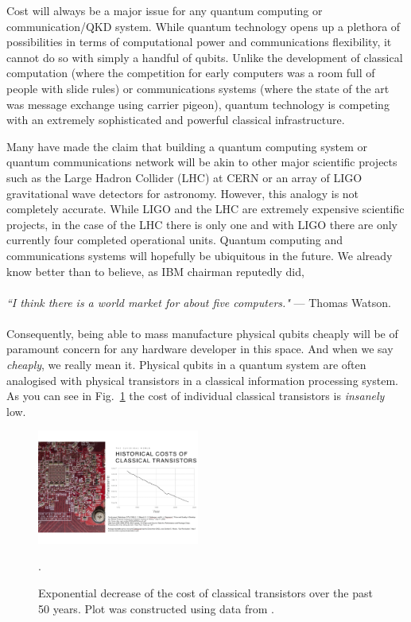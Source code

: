 \documentclass[twocolumn, aps, rmp, amsmath, amssymb, nofootinbib, superscriptaddress, longbibliography, floatfix, table-of-contents, eqsecnum]{revtex4-2}
\newcommand{\famousquote}[2]{\noindent\textit{``#1"} --- #2.\index{Quotes}\index{#2}}
\begin{document}
Cost will always be a major issue for any quantum computing or communication/QKD system. While quantum technology opens up a plethora of possibilities in terms of computational power and communications flexibility, it cannot do so with simply a handful of qubits. Unlike the development of classical computation (where the competition for early computers was a room full of people with slide rules) or communications systems (where the state of the art was message exchange using carrier pigeon), quantum technology is competing with an extremely sophisticated and powerful classical infrastructure. 

Many have made the claim that building a quantum computing system or quantum communications network will be akin to other major scientific projects such as the Large Hadron Collider (LHC) at CERN or an array of LIGO gravitational wave detectors for astronomy. However, this analogy is not completely accurate. While LIGO and the LHC are extremely expensive scientific projects, in the case of the LHC there is only one and with LIGO there are only currently four completed operational units. Quantum computing and communications systems will hopefully be ubiquitous in the future. We already know better than to believe, as IBM chairman reputedly did,
\\
\\
\famousquote{I think there is a world market for about five computers.}{Thomas Watson}
\\
\\
Consequently, being able to mass manufacture physical qubits cheaply will be of paramount concern for any hardware developer in this space. And when we say \textit{cheaply}, we really mean it. Physical qubits in a quantum system are often analogised with physical transistors in a classical information processing system. As you can see in Fig.~\ref{fig:price} the cost of individual classical transistors is \textit{insanely} low. 
 
\begin{figure}[htbp!]
	\includegraphics[clip=true, width=0.475\textwidth]{cost}
	\caption{Exponential decrease of the cost of classical transistors over the past 50 years.  Plot was constructed using data from \cite{SD-Berndt2000}.} \label{fig:price}.
\end{figure}
\end{document}
